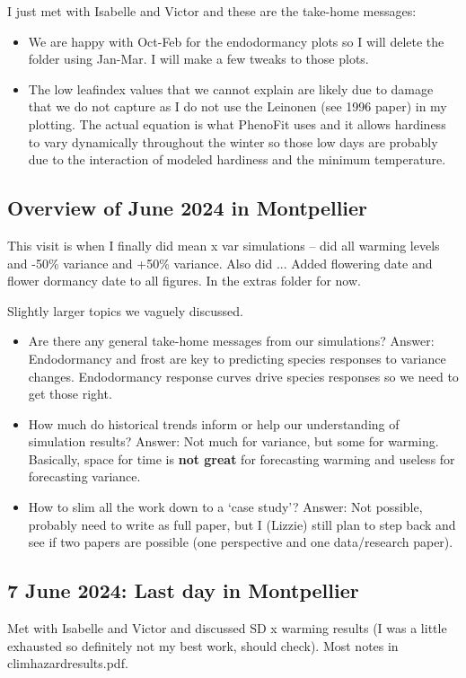 \documentclass[11pt,letter]{article}
\begin{document}
I just met with Isabelle and Victor and these are the take-home messages:
\begin{itemize}
\item We are happy with Oct-Feb for the endodormancy plots  so I will delete the folder using Jan-Mar. I will make a few tweaks to those plots. 
\item The low leafindex values that we cannot explain are likely due to damage that we do not capture as I do not use the Leinonen (see 1996 paper) in my plotting. The actual equation is what PhenoFit uses and it allows hardiness to vary dynamically throughout the winter so those low days are probably due to the interaction of modeled hardiness and the minimum temperature.
\end{itemize}

\subsection{Overview of June 2024 in Montpellier}
This visit is when I finally did mean x var simulations -- did all warming levels and -50\% variance and +50\% variance. 
Also did ... Added flowering date and flower dormancy date to all figures. In the extras folder for now. 

Slightly larger topics we vaguely discussed. 
\begin{itemize}
\item Are there any general take-home messages from our simulations? Answer: Endodormancy and frost are key to predicting species responses to variance changes. Endodormancy response curves drive species responses so we need to get those right. 
\item How much do historical trends inform or help our understanding of simulation results?  Answer: Not much for variance, but some for warming. Basically, space for time is {\bf not great} for forecasting warming and useless for forecasting variance. 
\item How to slim all the work down to a `case study'?  Answer: Not possible, probably need to write as full paper, but I (Lizzie) still plan to step back and see if two papers are possible (one perspective and one data/research paper). 
\end{itemize}

\subsection{7 June 2024: Last day in Montpellier}
Met with Isabelle and Victor and discussed SD x warming results (I was a little exhausted so definitely not my best work, should check). Most notes in climhazardresults.pdf. 
\end{document}
